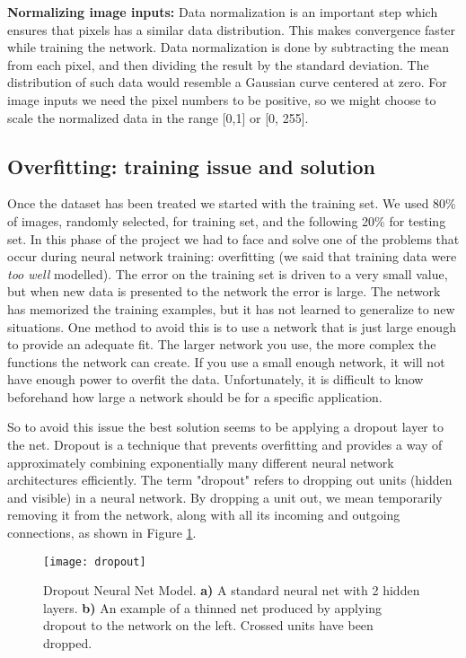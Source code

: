 \documentclass[../main.tex]{subfiles}
\begin{document}
\textbf{Normalizing image inputs:} Data normalization is an important step which ensures that pixels has a similar data distribution. This makes convergence faster while training the network. Data normalization is done by subtracting the mean from each pixel, and then dividing the result by the standard deviation. The distribution of such data would resemble a Gaussian curve centered at zero. For image inputs we need the pixel numbers to be positive, so we might choose to scale the normalized data in the range [0,1] or [0, 255]. 

\subsection{Overfitting: training issue and solution}
Once the dataset has been treated we started with the training set. We used 80\% of images, randomly selected, for training set, and the following 20\% for testing set.
In this phase of the project we had to face and solve one of the problems that occur during neural network training: overfitting (we said that training data were \textit{too well} modelled). The error on the training set is driven to a very small value, but when new data is presented to the network the error is large. The network has memorized the training examples, but it has not learned to generalize to new situations.
One method to avoid this is to use a network that is just large enough to provide an adequate fit. The larger network you use, the more complex the functions the network can create. If you use a small enough network, it will not have enough power to overfit the data. Unfortunately, it is difficult to know beforehand how large a network should be for a specific application. 

So to avoid this issue the best solution seems to be applying a dropout layer to the net.
Dropout is a technique that prevents overfitting and provides a way of approximately combining exponentially many different neural network architectures efficiently. The term "dropout" refers to dropping out units (hidden and visible) in a neural network. By dropping a unit out, we mean temporarily removing it from the network, along with all its incoming and outgoing connections, as shown in Figure \ref{dropout}.

\begin{figure}[htbp] 
\centering 
\texttt{[image: dropout]}
\caption{Dropout Neural Net Model. \textbf{a)} A standard neural net with 2 hidden layers. \textbf{b)} An example of a thinned net produced by applying dropout to the network on the left.
Crossed units have been dropped.} 
\label{dropout} 
\vspace{5mm}
\end{figure}
\end{document}
